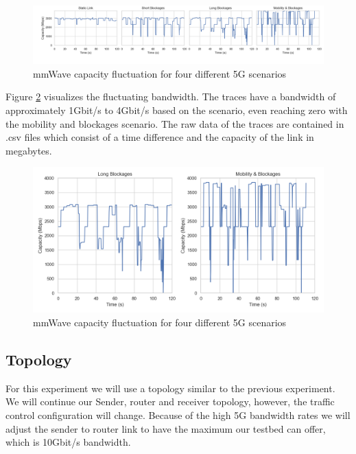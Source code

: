 \documentclass[a4paper,english, 11pt]{report}
\begin{document}
\begin{figure}[h!] %
	\centering
	\includegraphics[scale=0.33]{../diagrams/witestlab/mmwave_cap2.png}
  	\caption{mmWave capacity fluctuation for four different 5G scenarios}
  	\label{fig:witestlab_graph1}
\end{figure}

Figure \ref{fig:witestlab_graph1} visualizes the fluctuating bandwidth. The traces have a bandwidth of approximately 1Gbit/s to 4Gbit/s based on the scenario, even reaching zero with the mobility and blockages scenario. The raw data of the traces are contained in .csv files which consist of a time difference and the capacity of the link in megabytes.

\begin{figure}[h!] %
	\centering
	\includegraphics[scale=0.33]{../diagrams/witestlab/lb_mobb.png}
  	\caption{mmWave capacity fluctuation for four different 5G scenarios}
  	\label{fig:witestlab_graph1}
\end{figure}

\subsection{Topology}
For this experiment we will use a topology similar to the previous experiment. We will continue our Sender, router and receiver topology, however, the traffic control configuration will change. Because of the high 5G bandwidth rates we will adjust the sender to router link to have the maximum our testbed can offer, which is 10Gbit/s bandwidth.\\
\end{document}
